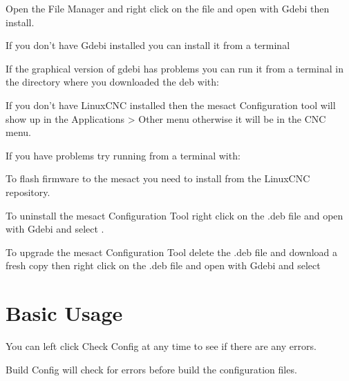 \documentclass[letterpaper,10pt,english,openany,oneside]{sphinxmanual}
\begin{document}
Open the File Manager and right click on the file and open with Gdebi then install.

If you don’t have Gdebi installed you can install it from a terminal

\begin{sphinxVerbatim}[commandchars=\\\{\}]
   
\end{sphinxVerbatim}

If the graphical version of gdebi has problems you can run it from a
terminal in the directory where you downloaded the deb with:

\begin{sphinxVerbatim}[commandchars=\\\{\}]
  
\end{sphinxVerbatim}

If you don’t have LinuxCNC installed then the mesact Configuration tool
will show up in the Applications \textgreater{} Other menu otherwise it will be in
the CNC menu.

If you have problems try running from a terminal with:

\begin{sphinxVerbatim}[commandchars=\\\{\}]
\end{sphinxVerbatim}

To flash firmware to the mesact you need to install
 from the LinuxCNC
repository.

To uninstall the mesact Configuration Tool right click on the .deb file
and open with Gdebi and select .

To upgrade the mesact Configuration Tool delete the .deb file and download
a fresh copy then right click on the .deb file and open with Gdebi and
select 


\chapter{Basic Usage}
\label{\detokenize{basic:basic-usage}}\label{\detokenize{basic::doc}}
You can left click Check Config at any time to see if there are any errors.

Build Config will check for errors before build the configuration files.
\end{document}
